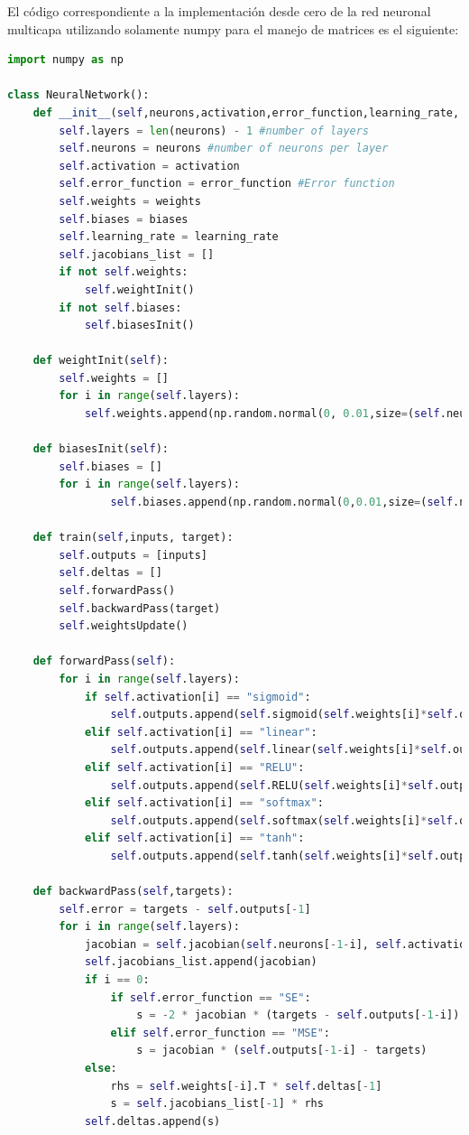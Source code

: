 \documentclass{article}
\begin{document}
El código correspondiente a la implementación desde cero de la red neuronal multicapa utilizando solamente numpy para el manejo de matrices es el siguiente:
\begin{lstlisting}[language=python]
import numpy as np

class NeuralNetwork():
    def __init__(self,neurons,activation,error_function,learning_rate, weights=None,biases=None):
        self.layers = len(neurons) - 1 #number of layers
        self.neurons = neurons #number of neurons per layer
        self.activation = activation
        self.error_function = error_function #Error function
        self.weights = weights
        self.biases = biases
        self.learning_rate = learning_rate
        self.jacobians_list = []
        if not self.weights:
            self.weightInit()
        if not self.biases:
            self.biasesInit()
    
    def weightInit(self):
        self.weights = []
        for i in range(self.layers):
            self.weights.append(np.random.normal(0, 0.01,size=(self.neurons[i+1],self.neurons[i])))
                
    def biasesInit(self):
        self.biases = []
        for i in range(self.layers):
                self.biases.append(np.random.normal(0,0.01,size=(self.neurons[i+1],1)))
            
    def train(self,inputs, target):
        self.outputs = [inputs]
        self.deltas = []
        self.forwardPass()
        self.backwardPass(target)
        self.weightsUpdate()
        
    def forwardPass(self):
        for i in range(self.layers):
            if self.activation[i] == "sigmoid":
                self.outputs.append(self.sigmoid(self.weights[i]*self.outputs[-1] + self.biases[i]))
            elif self.activation[i] == "linear":
                self.outputs.append(self.linear(self.weights[i]*self.outputs[-1] + self.biases[i]))
            elif self.activation[i] == "RELU":
                self.outputs.append(self.RELU(self.weights[i]*self.outputs[-1] + self.biases[i]))
            elif self.activation[i] == "softmax":
                self.outputs.append(self.softmax(self.weights[i]*self.outputs[-1] + self.biases[i]))
            elif self.activation[i] == "tanh":
                self.outputs.append(self.tanh(self.weights[i]*self.outputs[-1] + self.biases[i]))
            
    def backwardPass(self,targets):
        self.error = targets - self.outputs[-1]
        for i in range(self.layers):
            jacobian = self.jacobian(self.neurons[-1-i], self.activation[-1-i],self.outputs[-1-i])
            self.jacobians_list.append(jacobian)
            if i == 0:
                if self.error_function == "SE":
                    s = -2 * jacobian * (targets - self.outputs[-1-i])
                elif self.error_function == "MSE":
                    s = jacobian * (self.outputs[-1-i] - targets)
            else:
                rhs = self.weights[-i].T * self.deltas[-1]
                s = self.jacobians_list[-1] * rhs
            self.deltas.append(s)
    

\end{lstlisting}
\end{document}
